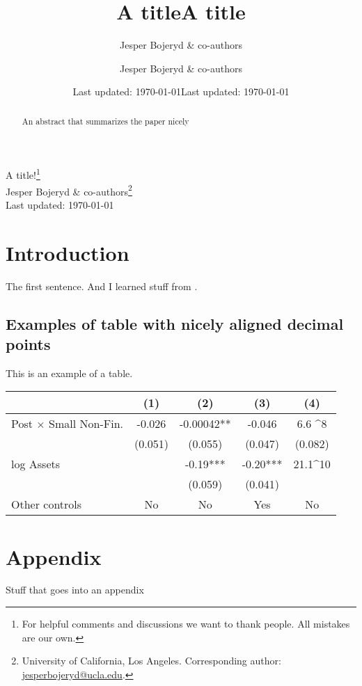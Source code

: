 \documentclass[12pt]{article}
\title{A title}
\date{Last updated: \today}
\author{Jesper Bojeryd \& co-authors}
\title{A title}
\date{Last updated: \today}
\author{Jesper Bojeryd \& co-authors}
\begin{document}
 
\begingroup 
\renewcommand{\thefootnote}{\fnsymbol{footnote}}
  \centering 
  \LARGE A title!\footnote{For helpful comments and discussions we want to thank people. All mistakes are our own.} \\[0.2em]
  \large Jesper Bojeryd \& co-authors\footnote{University of California, Los Angeles. Corresponding author: \url{jesperbojeryd@ucla.edu}.}\\[0.5em]
  Last updated: \today
  \\[1em]\par
\endgroup

\setcounter{footnote}{0}%

\begin{abstract}
    \noindent An abstract that summarizes the paper nicely
\end{abstract}

\section{Introduction}
The first sentence. And I learned stuff from \cite{paper2022}. \citep[Example of self citation:][followed by more text.]{bojeryd1991}

\subsection{Examples of table with nicely aligned decimal points}
This is an example of a table.

\begin{table}[h]\centering
    \begin{tabular}{lS[table-format=-1.3)]S[table-format=-1.5{**}]S[table-format=-1.2{***}]S[table-format=-2.1)e2, parse-numbers=false]}
    \toprule
                        & {(1)}     & {(2)}      & {(3)}    & {(4)}              \\ \midrule
    Post $\times$ Small Non-Fin.
                        & -0.026    & -0.00042** & -0.046   & 6.6 ^8    \\
                        & (0.051)   & (0.055)    & (0.047)  & (0.082)            \\
    log Assets          &           & -0.19***   & -0.20*** & 21.1^{10} \\
                        &           & (0.059)    & (0.041)  &                    \\
    Other controls      & {No}      & {No}       & {Yes}    & {No}               \\
    \bottomrule
    \end{tabular}
\end{table}










\newpage\clearpage
\appendix 
\setcounter{figure}{0} \renewcommand{\thefigure}{A\arabic{figure}}
\setcounter{table}{0} \renewcommand{\thetable}{A\arabic{table}}

\section*{Appendix}
Stuff that goes into an appendix
\end{document}
